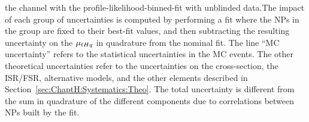\begin{table}[h]
{the \dilepSStau channel with the profile-likelihood-binned-fit with unblinded 
data.The impact of each group of uncertainties is computed 
by performing a fit where the NPs in the group are fixed to their best-fit values, and then subtracting the resulting 
uncertainty on the $\mu_{tHq}$ in quadrature from the nominal fit. The line ``MC uncertainty'' refers to the statistical 
uncertainties in the MC events.
The other theoretical uncertainties refer to the uncertainties on the cross-section, the ISR/FSR, alternative models, and
the other elements described in Section~\ref{sec:ChaptH:Systematics:Theo}.
The total uncertainty is different from the sum in quadrature of the different components due to correlations between
NPs built by the fit.}
\label{tab:ChaptH:Unblinded:GroupedSyst:SS}
\end{table}


\FloatBarrier
